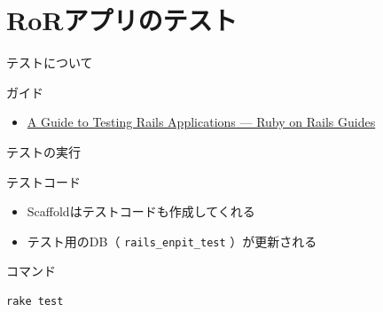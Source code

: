 \documentclass[t, aspectratio=169]{beamer}
\begin{document}
\section{RoRアプリのテスト}
\label{sec-7-2}
\begin{frame}[label=sec-7-2-1]{テストについて}
\begin{block}{ガイド}
\begin{itemize}
\item \href{http://guides.rubyonrails.org/testing.html}{A Guide to Testing Rails Applications — Ruby on Rails Guides}
\end{itemize}
\end{block}
\end{frame}
\begin{frame}[fragile,label=sec-7-2-2]{テストの実行}
 \begin{block}{テストコード}
\begin{itemize}
\item Scaffoldはテストコードも作成してくれる
\item テスト用のDB（ \texttt{rails\_enpit\_test} ）が更新される
\end{itemize}
\end{block}

\begin{block}{コマンド}
\begin{verbatim}
rake test
\end{verbatim}
\end{block}
\end{frame}
\end{document}
